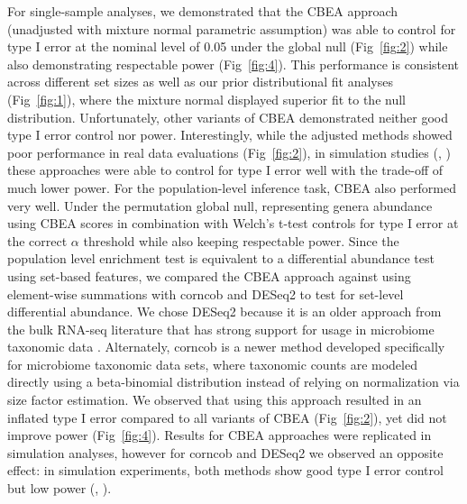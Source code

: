 \documentclass[10pt,letterpaper]{article}
\begin{document}
For single-sample analyses, we demonstrated that the CBEA approach (unadjusted with mixture normal parametric assumption) was able to control for type I error at the nominal level of 0.05 under the global null (Fig~\ref{fig:2}) while also demonstrating respectable power (Fig~\ref{fig:4}). This performance is consistent across different set sizes as well as our prior distributional fit analyses (Fig~\ref{fig:1}), where the mixture normal displayed superior fit to the null distribution. Unfortunately, other variants of CBEA demonstrated neither good type I error control nor power. Interestingly, while the adjusted methods showed poor performance in real data evaluations (Fig~\ref{fig:2}), in simulation studies (, ) these approaches were able to control for type I error well with the trade-off of much lower power. 
For the population-level inference task, CBEA also performed very well. Under the permutation global null, representing genera abundance using CBEA scores in combination with Welch's t-test controls for type I error at the correct $\alpha$ threshold while also keeping respectable power. Since the population level enrichment test is equivalent to a differential abundance test using set-based features, we compared the CBEA approach against using element-wise summations with corncob \cite{martin2020} and DESeq2 \cite{love2014} to test for set-level differential abundance. We chose DESeq2 because it is an older approach from the bulk RNA-seq literature that has strong support for usage in microbiome taxonomic data \cite{mcmurdie2014}. Alternately, corncob is a newer method developed specifically for microbiome taxonomic data sets, where taxonomic counts are modeled directly using a beta-binomial distribution instead of relying on normalization via size factor estimation. We observed that using this approach resulted in an inflated type I error compared to all variants of CBEA (Fig~\ref{fig:2}), yet did not improve power (Fig~\ref{fig:4}). Results for CBEA approaches were replicated in simulation analyses, however for corncob and DESeq2 we observed an opposite effect: in simulation experiments, both methods show good type I error control but low power (, ).  
\end{document}
